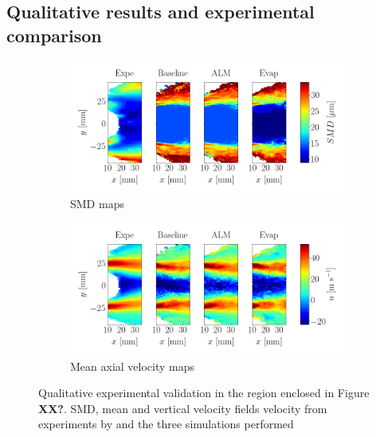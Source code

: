 \clearpage


\subsection{Qualitative results and experimental comparison}


\begin{figure}[h!]
\centering
\begin{subfigure}[b]{1.0\textwidth}
	\centering 
	\includegraphics[scale=0.7]{./part3_applications/figures_ch9_lagrangian/simus_expe_validation/subplots_maps_SMD.png}
   \caption{SMD maps}
\end{subfigure}

\vspace*{0.1in}

\begin{subfigure}[b]{1.0\textwidth}
	\centering
	\includegraphics[scale=0.7]{./part3_applications/figures_ch9_lagrangian/simus_expe_validation/subplots_maps_axial_velocity.png}
   \caption{Mean axial velocity maps}
\end{subfigure}
%
%
\caption[Qualitative experimental validation]{Qualitative experimental validation in the region enclosed in Figure \textbf{XX?}. SMD, mean and vertical velocity fields velocity from experiments by  and the three simulations performed}
\label{fig:validation_BIMER_lgs}
\end{figure}

